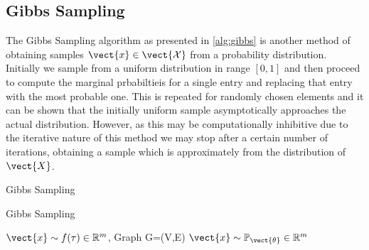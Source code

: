 \subsection{Gibbs Sampling}
The Gibbs Sampling algorithm as presented in \alg\ref{alg:gibbs} is another method of obtaining samples $\vect{x} \in \vect{\mathcal{X}}$ from a probability distribution. 
Initially we sample from a uniform distribution in range $[0,1]$ and then proceed to compute the marginal prbabiltieis for a single entry and replacing that entry with the most probable one.
This is repeated for randomly chosen elements and it can be shown that the initially uniform sample asymptotically approaches the actual distribution.
However, as this may be computationally inhibitive due to the iterative nature of this method we may stop after a certain number of iterations, obtaining a sample which is approximately from the distribution of $\vect{X}$.

\begin{algo}{Gibbs Sampling~\cite{yildirim2012bayesian}}
    \begin{algorithm}[H]
        \caption{Gibbs Sampling}
        \begin{algorithmic}[1]
            \label{alg:gibbs}
            \REQUIRE $\vect{x} \sim f(\tau) \in \mathbb{R}^m$, Graph G=(V,E)
            \ENSURE  $\vect{x} \sim \mathbb{P}_{\vect{\theta}}\in \mathbb{R}^m$ \\
                \ENDFOR
            \ENDFOR
        \end{algorithmic}
    \end{algorithm}
\end{algo}

